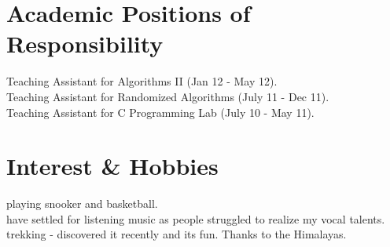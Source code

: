 \documentclass[margin,line]{resume}
\begin{document}
\begin{resume}

    \section{\mysidestyle Academic Positions of Responsibility} 
	Teaching Assistant for Algorithms II (Jan 12 - May 12).\\ 
	Teaching Assistant for Randomized Algorithms (July 11 - Dec 11).\\ 
	Teaching Assistant for C Programming Lab (July 10 - May 11).
    \section{\mysidestyle Interest \& Hobbies}
    playing snooker and basketball.\\
    have settled for listening music as people struggled to realize my vocal talents.\\
    trekking - discovered it recently and its fun. Thanks to the Himalayas.

\end{resume}
\end{document}
